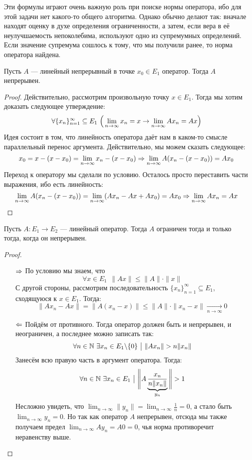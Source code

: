 \begin{note}
	Эти формулы играют очень важную роль при поиске нормы оператора, ибо для этой задачи нет какого-то общего алгоритма. Однако обычно делают так: вначале находят оценку в духе определения ограниченности, а затем, если вера в её неулучшаемость непоколебима, используют одно из супремумных определений. Если значение супремума сошлось к тому, что мы получили ранее, то норма оператора найдена.
\end{note}

\begin{proposition}
	Пусть $A$ --- линейный непрерывный в точке $x_0 \in E_1$ оператор. Тогда $A$ непрерывен.
\end{proposition}

\begin{proof}
	Действительно, рассмотрим произвольную точку $x \in E_1$. Тогда мы хотим доказать следующее утверждение:
	\[
		\forall \{x_n\}_{n = 1}^\infty \subseteq E_1\ \Big(\lim_{n \to \infty} x_n = x \ra \lim_{n \to \infty} Ax_n = Ax\Big)
	\]
	Идея состоит в том, что линейность оператора даёт нам в каком-то смысле параллельный перенос аргумента. Действительно, мы можем сказать следующее:
	\[
		x_0 = x - (x - x_0) = \lim_{n \to \infty} x_n - (x - x_0) \Rightarrow \lim_{n \to \infty} A(x_n - (x - x_0)) = Ax_0
	\]
	Переход к оператору мы сделали по условию. Осталось просто переставить части выражения, ибо есть линейность:
	\[
		\lim_{n \to \infty} A(x_n - (x - x_0)) = \lim_{n \to \infty} (Ax_n - Ax + Ax_0) = Ax_0 \Rightarrow \lim_{n \to \infty} Ax_n = Ax
	\]
\end{proof}

\begin{theorem}
	Пусть $A \colon E_1 \to E_2$ --- линейный оператор. Тогда $A$ ограничен тогда и только тогда, когда он непрерывен.
\end{theorem}

\begin{proof}~
	\begin{itemize}
		\item[$\Rightarrow$] По условию мы знаем, что
		\[
			\forall x \in E_1\ \ \|Ax\| \le \|A\| \cdot \|x\|
		\]
		С другой стороны, рассмотрим последовательность $\{x_n\}_{n = 1}^\infty \subseteq E_1$, сходящуюся к $x \in E_1$. Тогда:
		\[
			\|Ax_n - Ax\| = \|A(x_n - x)\| \le \|A\| \cdot \|x_n - x\| \xrightarrow[n \to \infty]{} 0
		\]
		
		\item[$\Leftarrow$] Пойдём от противного. Тогда оператор должен быть и непрерывен, и неограничен, а последнее можно записать так:
		\[
			\forall n \in \mathbb{N}\ \exists x_n \in E_1 \backslash \{0\} \ \big|\  \|Ax_n\| > n\|x_n\|
		\]
		Занесём всю правую часть в аргумент оператора. Тогда:
		\[
			\forall n \in \mathbb{N}\ \exists x_n \in E_1 \ \big|\  \Bigg\|A\underbrace{\frac{x_n}{n\|x_n\|}}_{y_n}\Bigg\| > 1
		\]
		Несложно увидеть, что $\lim_{n \to \infty} \|y_n\| = \lim_{n \to \infty} \frac{1}{n} = 0$, а стало быть $\lim_{n \to \infty} y_n = 0$. Но так как оператор $A$ непрерывен, отсюда мы также получаем предел $\lim_{n \to \infty} Ay_n = A0 = 0$, чья норма противоречит неравенству выше.
	\end{itemize}
\end{proof}

